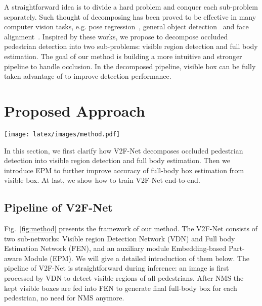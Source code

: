 \documentclass[10pt,twocolumn,letterpaper]{article}
\begin{document}
A straightforward idea is to divide a hard problem and conquer each sub-problem separately. Such thought of decomposing has been proved to be effective in many computer vision tasks, e.g. pose regression~\cite{dollar2010cascaded_pose}, general object detection~\cite{cai2019cascadercnn} and face alignment~\cite{cao2014face,yan2013learn}. Inspired by these works, we propose to decompose occluded pedestrian detection into two sub-problems: visible region detection and full body estimation. The goal of our method is building a more intuitive and stronger pipeline to handle occlusion. In the decomposed pipeline, visible box can be fully taken advantage of to improve detection performance.

\section{Proposed Approach}

\begin{figure*}[!t]
\begin{center}
 \texttt{[image: latex/images/method.pdf]}
\end{center}
   \caption{Framework of V2F-Net. The input image is first processed by Visible region Detection Network (VDN) to detect visible regions of all pedestrians. After NMS (only necessary during inference) these kept boxes are fed into Full body Estimation Network (FEN) to estimate the full body box for each pedestrian. During training, the visible boxes will also be passed to Embedding-based Part-aware Module (EPM) to predict visibility for each part of corresponding pedestrian. By supervising the part visibility, EPM works as an auxiliary module to make the estimation of full body be more accurate. $\bigodot$ is dot product operation. The dashed line and rectangle indicate they can be discarded during inference. In the output image, the green boxes and digits represent divided parts and  predicted scores by EPM respectively.}
\label{fig:method}
\end{figure*}

 In this section, we first clarify how V2F-Net decomposes occluded pedestrian detection into visible region detection and full body estimation. Then we introduce EPM to further improve accuracy of full-body box estimation from visible box. At last, we show how to train V2F-Net end-to-end.






\subsection{Pipeline of V2F-Net}
\label{sec:ppl}
Fig.~\ref{fig:method} presents the framework of our method. The V2F-Net consists of two sub-networks: Visible region Detection Network (VDN) and Full body Estimation Network (FEN), and an auxiliary module Embedding-based Part-aware Module (EPM). We will give a detailed introduction of them below. The pipeline of V2F-Net is straightforward during inference: an image is first processed by VDN to detect visible regions of all pedestrians. After NMS the kept visible boxes are fed into FEN to generate final full-body box for each pedestrian, no need for NMS anymore.
\end{document}

